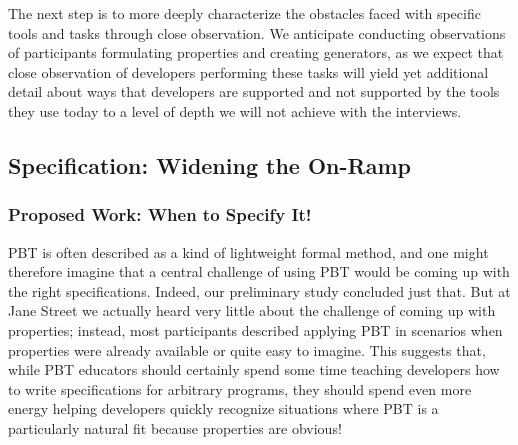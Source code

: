 The next step is to more deeply characterize the obstacles faced with specific
tools and tasks through close observation. We anticipate conducting observations
of participants formulating properties and creating generators, as we expect
that close observation of developers performing these tasks will yield yet
additional detail about ways that developers are supported and not supported by
the tools they use today to a level of depth we will not achieve with the
interviews.



\subsection{Specification: Widening the On-Ramp }\label{sec:spec}


\subsubsection{Proposed Work: When to Specify It!}
PBT is often described as a kind of lightweight formal method, and one
might therefore imagine that a central challenge of using PBT would be
coming up with the
right specifications. Indeed, our preliminary study concluded just that. But at
Jane Street we actually heard very little about the challenge of coming up with
properties; instead, most participants described applying PBT in scenarios when
properties were already available or quite easy to imagine.  This suggests that,
while PBT educators should certainly spend some time teaching developers how to
write specifications for arbitrary programs, they should spend even more energy
helping developers quickly recognize  situations where PBT is a particularly
natural fit because properties are obvious!

